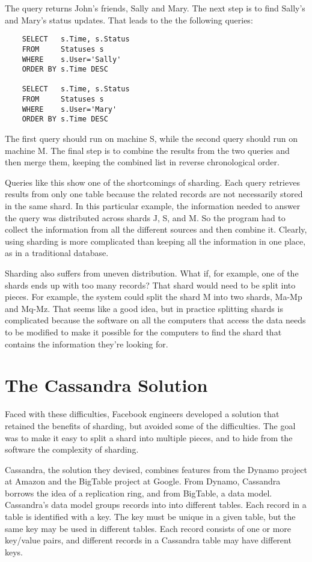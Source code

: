 The query returns John's friends, Sally and Mary.
The next step is to find Sally's and Mary's status updates.
That leads to the the following queries:
\begin{code}
\begin{verbatim}
	SELECT   s.Time, s.Status
	FROM     Statuses s
	WHERE    s.User='Sally'
	ORDER BY s.Time DESC

	SELECT   s.Time, s.Status
	FROM     Statuses s
	WHERE    s.User='Mary'
	ORDER BY s.Time DESC
\end{verbatim}
\end{code}

The first query should run on machine S,
while the second query should run on machine M.
The final step is to combine the results from the two queries
and then merge them, keeping
the combined list in reverse chronological order.

Queries like this show one of the shortcomings of sharding.
Each query retrieves results from only one table
because the related records
are not necessarily stored in the same shard.
In this particular example, the information needed to answer the query was
distributed across shards J, S, and M.
So the program had to collect the information
from all the different sources and then combine it.
Clearly, using sharding is more complicated
than keeping all the information in one place,
as in a traditional database.

Sharding also suffers from uneven distribution.
What if, for example, one of the shards ends up with too many records?
That shard would need to be split into pieces.
For example, the system could
split the shard M into two shards, Ma-Mp and Mq-Mz.
That seems like a good idea, but in practice splitting shards
is complicated because the software on all the computers that access the data
needs to be modified to make it possible for the computers
to find the shard that contains the information they're looking for.

\section{The Cassandra Solution}

Faced with these difficulties, Facebook engineers developed a solution that
retained the benefits of sharding, but avoided some of the difficulties.
The goal was to make it easy to split a shard into multiple pieces,
and to hide from the software the complexity of sharding.

Cassandra, the solution they devised, combines features
from the Dynamo project at Amazon and the BigTable project at Google.
From Dynamo, Cassandra borrows the idea of a replication ring,
and from BigTable, a data model.
Cassandra's data model groups records into into different tables.
Each record in a table is identified with a key.
The key must be unique in a given table,
but the same key may be used in different tables.
Each record consists of one or more key/value pairs, and
different records in a Cassandra table may have different keys.

